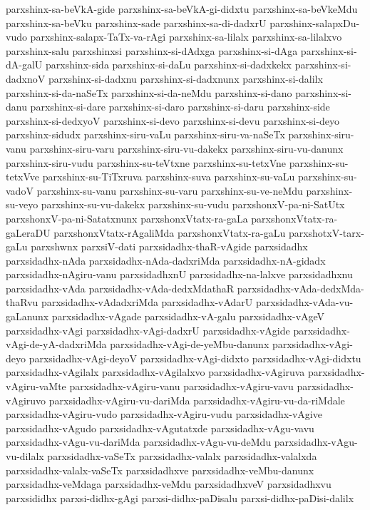 {parxshinx-sa-beVkA-gide
parxshinx-sa-beVkA-gi-didxtu
parxshinx-sa-beVkeMdu
parxshinx-sa-beVku
parxshinx-sade
parxshinx-sa-di-dadxrU
parxshinx-salapxDu-vudo
parxshinx-salapx-TaTx-va-rAgi
parxshinx-sa-lilalx
parxshinx-sa-lilalxvo
parxshinx-salu
parxshinxsi
parxshinx-si-dAdxga
parxshinx-si-dAga
parxshinx-si-dA-galU
parxshinx-sida
parxshinx-si-daLu
parxshinx-si-dadxkekx
parxshinx-si-dadxnoV
parxshinx-si-dadxnu
parxshinx-si-dadxnunx
parxshinx-si-dalilx
parxshinx-si-da-naSeTx
parxshinx-si-da-neMdu
parxshinx-si-dano
parxshinx-si-danu
parxshinx-si-dare
parxshinx-si-daro
parxshinx-si-daru
parxshinx-side
parxshinx-si-dedxyoV
parxshinx-si-devo
parxshinx-si-devu
parxshinx-si-deyo
parxshinx-sidudx
parxshinx-siru-vaLu
parxshinx-siru-va-naSeTx
parxshinx-siru-vanu
parxshinx-siru-varu
parxshinx-siru-vu-dakekx
parxshinx-siru-vu-danunx
parxshinx-siru-vudu
parxshinx-su-teVtxne
parxshinx-su-tetxVne
parxshinx-su-tetxVve
parxshinx-su-TiTxruva
parxshinx-suva
parxshinx-su-vaLu
parxshinx-su-vadoV
parxshinx-su-vanu
parxshinx-su-varu
parxshinx-su-ve-neMdu
parxshinx-su-veyo
parxshinx-su-vu-dakekx
parxshinx-su-vudu
parxshonxV-pa-ni-SatUtx
parxshonxV-pa-ni-Satatxnunx
parxshonxVtatx-ra-gaLa
parxshonxVtatx-ra-gaLeraDU
parxshonxVtatx-rAgaliMda
parxshonxVtatx-ra-gaLu
parxshotxV-tarx-gaLu
parxshwnx
parxsiV-dati
parxsidadhx-thaR-vAgide
parxsidadhx
parxsidadhx-nAda
parxsidadhx-nAda-dadxriMda
parxsidadhx-nA-gidadx
parxsidadhx-nAgiru-vanu
parxsidadhxnU
parxsidadhx-na-lalxve
parxsidadhxnu
parxsidadhx-vAda
parxsidadhx-vAda-dedxMdathaR
parxsidadhx-vAda-dedxMda-thaRvu
parxsidadhx-vAdadxriMda
parxsidadhx-vAdarU
parxsidadhx-vAda-vu-gaLanunx
parxsidadhx-vAgade
parxsidadhx-vA-galu
parxsidadhx-vAgeV
parxsidadhx-vAgi
parxsidadhx-vAgi-dadxrU
parxsidadhx-vAgide
parxsidadhx-vAgi-de-yA-dadxriMda
parxsidadhx-vAgi-de-yeMbu-danunx
parxsidadhx-vAgi-deyo
parxsidadhx-vAgi-deyoV
parxsidadhx-vAgi-didxto
parxsidadhx-vAgi-didxtu
parxsidadhx-vAgilalx
parxsidadhx-vAgilalxvo
parxsidadhx-vAgiruva
parxsidadhx-vAgiru-vaMte
parxsidadhx-vAgiru-vanu
parxsidadhx-vAgiru-vavu
parxsidadhx-vAgiruvo
parxsidadhx-vAgiru-vu-dariMda
parxsidadhx-vAgiru-vu-da-riMdale
parxsidadhx-vAgiru-vudo
parxsidadhx-vAgiru-vudu
parxsidadhx-vAgive
parxsidadhx-vAgudo
parxsidadhx-vAgutatxde
parxsidadhx-vAgu-vavu
parxsidadhx-vAgu-vu-dariMda
parxsidadhx-vAgu-vu-deMdu
parxsidadhx-vAgu-vu-dilalx
parxsidadhx-vaSeTx
parxsidadhx-valalx
parxsidadhx-valalxda
parxsidadhx-valalx-vaSeTx
parxsidadhxve
parxsidadhx-veMbu-danunx
parxsidadhx-veMdaga
parxsidadhx-veMdu
parxsidadhxveV
parxsidadhxvu
parxsididhx
parxsi-didhx-gAgi
parxsi-didhx-paDisalu
parxsi-didhx-paDisi-dalilx
}
